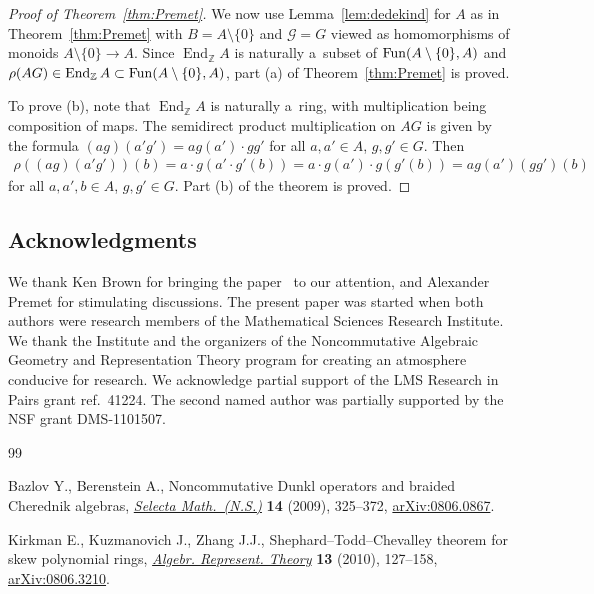 \documentclass[pdftex]{sigma}
\DeclareMathOperator{\End}{End}
\begin{document}
\begin{proof}[Proof of Theorem~\ref{thm:Premet}]
We now use Lemma~\ref{lem:dedekind} for $A$ as in Theorem~\ref{thm:Premet} with $B=A\setminus\{0\}$ and $\mathcal G=G$
viewed as homomorphisms of monoids $A\setminus\{0\} \to A$.
Since $\End_\mathbb Z A$ is naturally a~subset of ${\rm Fun}(A\setminus\{0\},A)$ and $\rho(AG)\in \End_\mathbb Z
A\subset{\rm Fun}(A\setminus\{0\},A)$, part (a) of Theorem~\ref{thm:Premet} is proved.

To prove (b), note that $\End_\mathbb Z A$ is naturally a~ring, with multiplication being composition of maps.
The semidirect product multiplication on $A G$ is given by the formula $(ag)(a'g')=ag(a')\cdot gg'$ for all $a,a'\in A$,
$g,g'\in G$.
Then
\begin{gather*}
\rho((ag)(a'g'))(b)=a\cdot g(a'\cdot g'(b))=a\cdot g(a')\cdot g(g'(b)) = ag(a') (gg')(b)
\end{gather*}
for all $a,a',b\in A$, $g,g'\in G$.
Part (b) of the theorem is proved.
\end{proof}

\subsection*{Acknowledgments}

We thank Ken Brown for bringing the paper~\cite{KKZ} to our attention, and Alexander
Premet for stimulating discussions.
The present paper was started when both authors were research members of the Mathematical Sciences Research Institute.
We thank the Institute and the organizers of the Noncommutative Algebraic Geometry and Representation Theory program for
creating an atmosphere conducive for research.
We acknowledge partial support of the LMS Research in Pairs grant ref.~41224.
The second named author was partially supported by the NSF grant DMS-1101507.

\begin{thebibliography}{99}
\footnotesize\itemsep=0pt

Bazlov Y., Berenstein A., Noncommutative {D}unkl operators and braided
  {C}herednik algebras, \href{http://dx.doi.org/10.1007/s00029-009-0525-x}{\textit{Selecta Math.~(N.S.)}} \textbf{14} (2009),
  325--372, \href{http://arxiv.org/abs/0806.0867}{arXiv:0806.0867}.

Kirkman E., Kuzmanovich J., Zhang J.J., Shephard--{T}odd--{C}hevalley theorem
  for skew polynomial rings, \href{http://dx.doi.org/10.1007/s10468-008-9109-2}{\textit{Algebr. Represent. Theory}} \textbf{13}
  (2010), 127--158, \href{http://arxiv.org/abs/0806.3210}{arXiv:0806.3210}.

\end{thebibliography}\LastPageEnding
\end{document}
